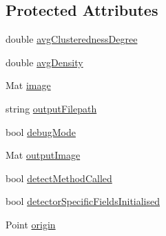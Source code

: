 \subsection*{\-Protected \-Attributes}
\begin{DoxyCompactItemize}
\item 
double \hyperlink{classmultiscale_1_1analysis_1_1Detector_a6d06607ae468a56e48f8daba0a00df5b}{avg\-Clusteredness\-Degree}
\item 
double \hyperlink{classmultiscale_1_1analysis_1_1Detector_a411629d4cf34809127662d625ba057c0}{avg\-Density}
\item 
\-Mat \hyperlink{classmultiscale_1_1analysis_1_1Detector_a523830a6cfe409694ce8327c3c736fbd}{image}
\item 
string \hyperlink{classmultiscale_1_1analysis_1_1Detector_a1a83df16d8afd347c0e1c9ddc41c9bee}{output\-Filepath}
\item 
bool \hyperlink{classmultiscale_1_1analysis_1_1Detector_a4b42f796957efd6ee0b8cf7645494a65}{debug\-Mode}
\item 
\-Mat \hyperlink{classmultiscale_1_1analysis_1_1Detector_a144e080a3af03c9bf3d8a80315823c86}{output\-Image}
\item 
bool \hyperlink{classmultiscale_1_1analysis_1_1Detector_ad565f471d9d7db7692da588ff0d6be2f}{detect\-Method\-Called}
\item 
bool \hyperlink{classmultiscale_1_1analysis_1_1Detector_a172b91067670a14a7707f24dc218f2af}{detector\-Specific\-Fields\-Initialised}
\item 
\-Point \hyperlink{classmultiscale_1_1analysis_1_1Detector_a002237e2ad684975a7c8b1e12dd7d780}{origin}
\end{DoxyCompactItemize}
